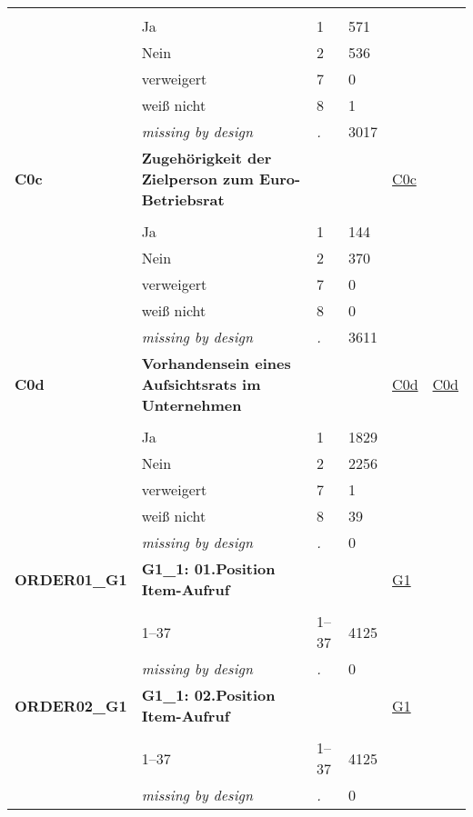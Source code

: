 \begin{longtable}{| L{2.45cm} | L{6cm} | C{1.5cm} | R{1cm} | C{2.25cm} | C{2.25cm} |}
   &  &  &  &  &  \\ 
   & Ja & 1 & 571 &  &  \\ 
   & Nein & 2 & 536 &  &  \\ 
   & verweigert & 7 & 0 &  &  \\ 
   & weiß nicht & 8 & 1 &  &  \\ 
   & \textit{missing by design} & \textit{.} & 3017 &  &  \\ 
   \midrule
\textbf{C0c}\label{var:C0c} & \textbf{Zugehörigkeit der Zielperson zum Euro-Betriebsrat} &  &  & \hyperref[C0c]{C0c} & \hyperref[var:suf:]{} \\ 
   &  &  &  &  &  \\ 
   & Ja & 1 & 144 &  &  \\ 
   & Nein & 2 & 370 &  &  \\ 
   & verweigert & 7 & 0 &  &  \\ 
   & weiß nicht & 8 & 0 &  &  \\ 
   & \textit{missing by design} & \textit{.} & 3611 &  &  \\ 
   \midrule
\textbf{C0d}\label{var:C0d} & \textbf{Vorhandensein eines Aufsichtsrats im Unternehmen} &  &  & \hyperref[C0d]{C0d} & \hyperref[var:suf:C0d]{C0d} \\ 
   &  &  &  &  &  \\ 
   & Ja & 1 & 1829 &  &  \\ 
   & Nein & 2 & 2256 &  &  \\ 
   & verweigert & 7 & 1 &  &  \\ 
   & weiß nicht & 8 & 39 &  &  \\ 
   & \textit{missing by design} & \textit{.} & 0 &  &  \\ 
   \midrule
\textbf{ORDER01\_G1}\label{var:ORDER01:G1} & \textbf{G1\_1: 01.Position Item-Aufruf} &  &  & \hyperref[G1]{G1} & \hyperref[var:suf:]{} \\ 
   &  &  &  &  &  \\ 
   & 1--37 & 1--37 & 4125 &  &  \\ 
   & \textit{missing by design} & \textit{.} & 0 &  &  \\ 
   \midrule
\textbf{ORDER02\_G1}\label{var:ORDER02:G1} & \textbf{G1\_1: 02.Position Item-Aufruf} &  &  & \hyperref[G1]{G1} & \hyperref[var:suf:]{} \\ 
   &  &  &  &  &  \\ 
   & 1--37 & 1--37 & 4125 &  &  \\ 
   & \textit{missing by design} & \textit{.} & 0 &  &  \\ 

\end{longtable}
